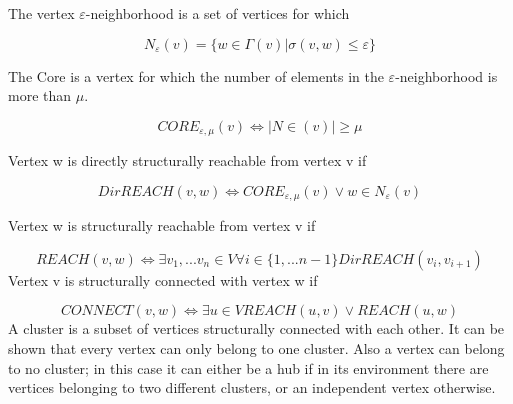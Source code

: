 \documentclass[a4paper,12pt]{article}
\begin{document}
The vertex $\varepsilon$-neighborhood is a set of vertices for which

$$
N_{\varepsilon}(v) = \{ w \in \Gamma(v) | \sigma(v,w) \le \varepsilon \}
$$

The Core is a vertex for which the number of elements in the $\varepsilon$-neighborhood is more than $\mu$.


$$
CORE_{\varepsilon,\mu}(v) \Leftrightarrow |N \in (v)| \ge \mu
$$

Vertex w is directly structurally reachable from vertex v if

$$
DirREACH(v,w) \Leftrightarrow CORE_{\varepsilon,\mu}(v) \vee w \in N_{\varepsilon}(v)
$$

Vertex w is structurally reachable from vertex v if

$$
REACH(v,w) \Leftrightarrow \exists v_1,...v_n \in V \forall i \in \{1,...n-1\}DirREACH(v_i,v_{i+1})
$$
Vertex v is structurally connected with vertex w if

$$
CONNECT(v,w) \Leftrightarrow \exists u \in V REACH(u,v) \vee REACH(u,w)
$$
A cluster is a subset of vertices structurally connected with each other. It can be shown that
every vertex can only belong to one cluster. Also a vertex can belong to no cluster; in this
case it can either be a hub if in its environment there are vertices belonging to two different clusters, or an independent vertex otherwise.
\end{document}

